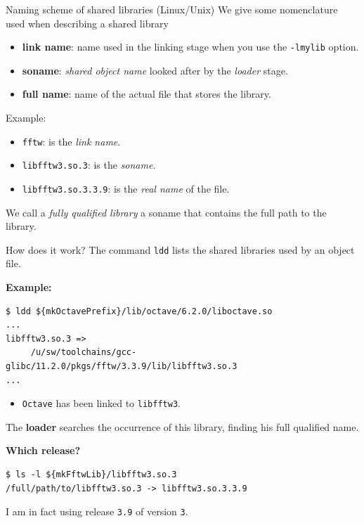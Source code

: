\documentclass[10pt,aspectratio=169]{beamer}
\begin{document}
\begin{frame}[fragile]{Naming scheme of shared libraries (Linux/Unix)}
  We give some nomenclature used when describing a shared library

  \begin{itemize}
      \item \textbf{link name}: name used in the linking stage when
    you use the \texttt{-lmylib} option.  
    \item \textbf{soname}: \textit{shared object name} looked after
    by the \emph{loader} stage.  
\item \textbf{full name}: name of the actual file that stores the library. 
  \end{itemize}
\medskip

    Example:
    \begin{itemize}
        \item[] \texttt{fftw}: is the \textit{link name}.
        \item[] \texttt{libfftw3.so.3}: is the \textit{soname}.
        \item[] \texttt{libfftw3.so.3.3.9}: is the \textit{real name} of the file.
    \end{itemize}

    We call a \textit{fully qualified library} a soname that contains the full path to the library.
\end{frame}


\begin{frame}[fragile]{How does it work?}  The command
  \texttt{ldd} lists the shared libraries used by an object file. \\
  \medskip
  
\textbf{Example:}
\begin{verbatim}
$ ldd ${mkOctavePrefix}/lib/octave/6.2.0/liboctave.so
...
libfftw3.so.3 =>
     /u/sw/toolchains/gcc-glibc/11.2.0/pkgs/fftw/3.3.9/lib/libfftw3.so.3
...
\end{verbatim}
\begin{itemize}
	\item \texttt{Octave} has been linked to \texttt{libfftw3}.
\end{itemize}

The \textbf{loader} searches the occurrence of this library, finding his full qualified name. \\ \medskip

\textbf{Which release?} 
\begin{verbatim}
$ ls -l ${mkFftwLib}/libfftw3.so.3
/full/path/to/libfftw3.so.3 -> libfftw3.so.3.3.9
\end{verbatim}
I am in fact using release \texttt{3.9} of version \texttt{3}.
\end{frame}
\end{document}
